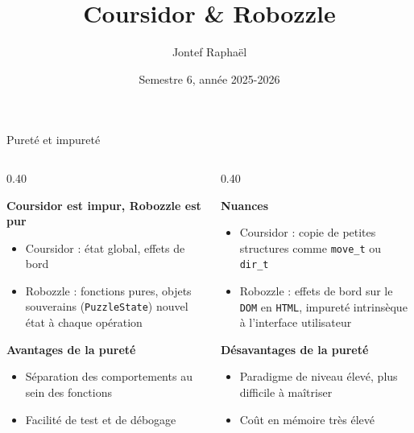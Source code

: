 \documentclass[aspectratio=169]{beamer}
\title{Coursidor \& Robozzle}
\author{Jontef Raphaël}
\institute{Enseirb-Matmeca}
\date{Semestre 6, année 2025-2026}
\begin{document}
\begin{frame}{Pureté et impureté}

\begin{columns}[T]

\begin{column}{0.40\textwidth}

\textbf{Coursidor est impur, Robozzle est pur}
\begin{itemize}
    \item Coursidor : état global, effets de bord
    \item Robozzle : fonctions pures, objets souverains (\texttt{PuzzleState}) nouvel état à chaque opération
\end{itemize}

\vspace{1cm}
\textbf{Avantages de la pureté}
\begin{itemize}
    \item Séparation des comportements au sein des fonctions
    \item Facilité de test et de débogage
\end{itemize}
\end{column}

\begin{column}{0.40\textwidth}

\textbf{Nuances}
\begin{itemize}
    \item Coursidor : copie de petites structures comme \texttt{move\_t} ou \texttt{dir\_t}
    \item Robozzle : effets de bord sur le \texttt{DOM} en \texttt{HTML}, impureté intrinsèque à l'interface utilisateur
\end{itemize}

\vspace{0.4cm}

\textbf{Désavantages de la pureté}
\begin{itemize}
    \item Paradigme de niveau élevé, plus difficile à maîtriser
    \item Coût en mémoire très élevé
\end{itemize}

\end{column}




\end{columns}

\end{frame}

\end{document}
